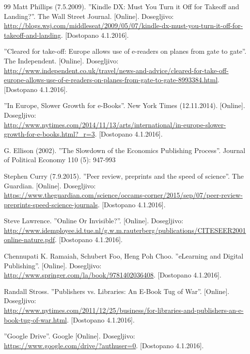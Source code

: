 \documentclass[a4paper, 12pt]{book}
\begin{document}
\begin{thebibliography}{99}
 Matt Phillips (7.5.2009). ''Kindle DX: Must You Turn it Off for Takeoff and Landing?''. The Wall Street Journal. 
[Online]. Dosegljivo:\\ \url{http://blogs.wsj.com/middleseat/2009/05/07/kindle-dx-must-you-turn-it-off-for-takeoff-and-landing}.
[Dostopano 4.1.2016].



 ''Cleared for take-off: Europe allows use of e-readers on planes from gate to gate''. The Independent. 
[Online]. Dosegljivo:\\ \url{http://www.independent.co.uk/travel/news-and-advice/cleared-for-take-off-europe-allows-use-of-e-readers-on-planes-from-gate-to-gate-8993384.html}.
[Dostopano 4.1.2016].


 ''In Europe, Slower Growth for e-Books''. New York Times (12.11.2014).
[Online]. Dosegljivo:\\ \url{http://www.nytimes.com/2014/11/13/arts/international/in-europe-slower-growth-for-e-books.html?\_r=3}.
[Dostopano 4.1.2016].




 G. Ellison (2002). ''The Slowdown of the Economics Publishing Process''. Journal of Political Economy 110 (5): 947-993

Stephen Curry (7.9.2015). ''Peer review, preprints and the speed of science''. The Guardian.
[Online]. Dosegljivo:\\
\url{https://www.theguardian.com/science/occams-corner/2015/sep/07/peer-review-preprints-speed-science-journals}.
[Dostopano 4.1.2016].

 Steve Lawrence. ''Online Or Invisible?''. 
[Online]. Dosegljivo:\\ 
\url{http://www.idemployee.id.tue.nl/g.w.m.rauterberg/publications/CITESEER2001online-nature.pdf}.
[Dostopano 4.1.2016].

 Chennupati K. Ramaiah, Schubert Foo, Heng Poh Choo. ''eLearning and Digital Publishing''.
[Online]. Dosegljivo:\\ 
\url{http://www.springer.com/la/book/9781402036408}.
[Dostopano 4.1.2016].

 Randall Stross. ''Publishers vs. Libraries: An E-Book Tug of War''.
[Online]. Dosegljivo:\\ \url{http://www.nytimes.com/2011/12/25/business/for-libraries-and-publishers-an-e-book-tug-of-war.html}.
[Dostopano 4.1.2016].

 ''Google Drive''. Google
[Online]. Dosegljivo:\\ 
\url{https://www.google.com/drive/?authuser=0}.
[Dostopano 4.1.2016].


\end{thebibliography}
\end{document}
